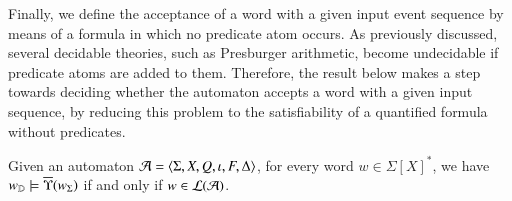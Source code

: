 
Finally, we define the acceptance of a word with a given input event
sequence by means of a formula in which no predicate atom occurs. As
previously discussed, several decidable theories, such as Presburger
arithmetic, become undecidable if predicate atoms are added to
them. Therefore, the result below makes a step towards deciding
whether the automaton accepts a word with a given input sequence, by
reducing this problem to the satisfiability of a quantified formula
without predicates. 

\begin{lemma}\label{lemma:quant-pred-acceptance}
  Given an automaton $\mathcal{A} = \langle \Sigma,X,Q,\iota,F,\Delta \rangle$, for
  every word $w \in \Sigma[X]^*$, we have ${w}_{\mathbb{D}} \models
  \overline{\Upsilon}({{w}_\Sigma})$ if and only if $w \in {\mathcal L}({\mathcal{A}})$.
\end{lemma}

